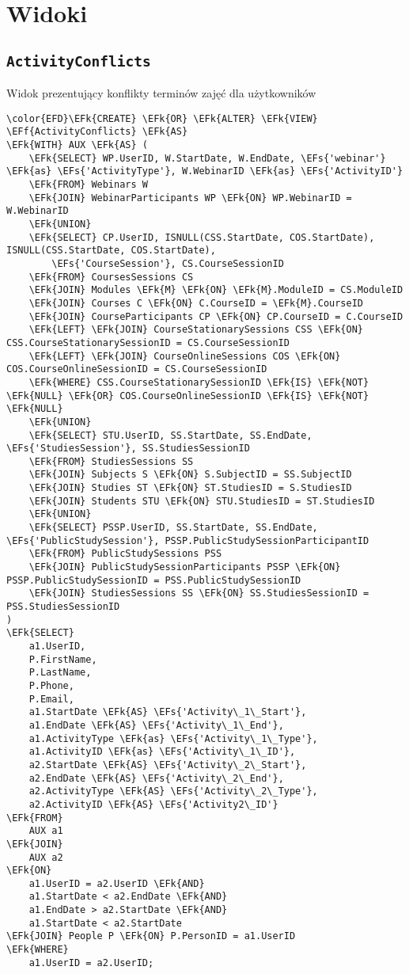 \documentclass[11pt]{article}
\newcommand{\EFs}[1]{\textcolor{EFs}{#1}} %
\newcommand{\EFk}[1]{\textcolor{EFk}{\textbf{#1}}} %
\newcommand{\EFf}[1]{\textcolor{EFf}{#1}} %
\begin{document}
\section{Widoki}
\label{sec:org6e84507}
\subsection{\texttt{ActivityConflicts}}
\label{sec:orge1fb9e8}
Widok prezentujący konflikty terminów zajęć dla użytkowników
\begin{Code}
\begin{Verbatim}
\color{EFD}\EFk{CREATE} \EFk{OR} \EFk{ALTER} \EFk{VIEW} \EFf{ActivityConflicts} \EFk{AS}
\EFk{WITH} AUX \EFk{AS} (
    \EFk{SELECT} WP.UserID, W.StartDate, W.EndDate, \EFs{'webinar'} \EFk{as} \EFs{'ActivityType'}, W.WebinarID \EFk{as} \EFs{'ActivityID'}
    \EFk{FROM} Webinars W 
    \EFk{JOIN} WebinarParticipants WP \EFk{ON} WP.WebinarID = W.WebinarID
    \EFk{UNION}
    \EFk{SELECT} CP.UserID, ISNULL(CSS.StartDate, COS.StartDate), ISNULL(CSS.StartDate, COS.StartDate),
        \EFs{'CourseSession'}, CS.CourseSessionID
    \EFk{FROM} CoursesSessions CS 
    \EFk{JOIN} Modules \EFk{M} \EFk{ON} \EFk{M}.ModuleID = CS.ModuleID
    \EFk{JOIN} Courses C \EFk{ON} C.CourseID = \EFk{M}.CourseID
    \EFk{JOIN} CourseParticipants CP \EFk{ON} CP.CourseID = C.CourseID
    \EFk{LEFT} \EFk{JOIN} CourseStationarySessions CSS \EFk{ON} CSS.CourseStationarySessionID = CS.CourseSessionID
    \EFk{LEFT} \EFk{JOIN} CourseOnlineSessions COS \EFk{ON} COS.CourseOnlineSessionID = CS.CourseSessionID
    \EFk{WHERE} CSS.CourseStationarySessionID \EFk{IS} \EFk{NOT} \EFk{NULL} \EFk{OR} COS.CourseOnlineSessionID \EFk{IS} \EFk{NOT} \EFk{NULL}
    \EFk{UNION}
    \EFk{SELECT} STU.UserID, SS.StartDate, SS.EndDate, \EFs{'StudiesSession'}, SS.StudiesSessionID
    \EFk{FROM} StudiesSessions SS
    \EFk{JOIN} Subjects S \EFk{ON} S.SubjectID = SS.SubjectID
    \EFk{JOIN} Studies ST \EFk{ON} ST.StudiesID = S.StudiesID
    \EFk{JOIN} Students STU \EFk{ON} STU.StudiesID = ST.StudiesID
    \EFk{UNION}
    \EFk{SELECT} PSSP.UserID, SS.StartDate, SS.EndDate, \EFs{'PublicStudySession'}, PSSP.PublicStudySessionParticipantID
    \EFk{FROM} PublicStudySessions PSS 
    \EFk{JOIN} PublicStudySessionParticipants PSSP \EFk{ON} PSSP.PublicStudySessionID = PSS.PublicStudySessionID
    \EFk{JOIN} StudiesSessions SS \EFk{ON} SS.StudiesSessionID = PSS.StudiesSessionID
)
\EFk{SELECT} 
    a1.UserID, 
    P.FirstName, 
    P.LastName, 
    P.Phone,
    P.Email,
    a1.StartDate \EFk{AS} \EFs{'Activity\_1\_Start'}, 
    a1.EndDate \EFk{AS} \EFs{'Activity\_1\_End'}, 
    a1.ActivityType \EFk{as} \EFs{'Activity\_1\_Type'},
    a1.ActivityID \EFk{as} \EFs{'Activity\_1\_ID'},
    a2.StartDate \EFk{AS} \EFs{'Activity\_2\_Start'}, 
    a2.EndDate \EFk{AS} \EFs{'Activity\_2\_End'},
    a2.ActivityType \EFk{AS} \EFs{'Activity\_2\_Type'},
    a2.ActivityID \EFk{AS} \EFs{'Activity2\_ID'}
\EFk{FROM} 
    AUX a1
\EFk{JOIN} 
    AUX a2 
\EFk{ON} 
    a1.UserID = a2.UserID \EFk{AND} 
    a1.StartDate < a2.EndDate \EFk{AND} 
    a1.EndDate > a2.StartDate \EFk{AND}
    a1.StartDate < a2.StartDate
\EFk{JOIN} People P \EFk{ON} P.PersonID = a1.UserID
\EFk{WHERE} 
    a1.UserID = a2.UserID;
\end{Verbatim}
\end{Code}
\end{document}
